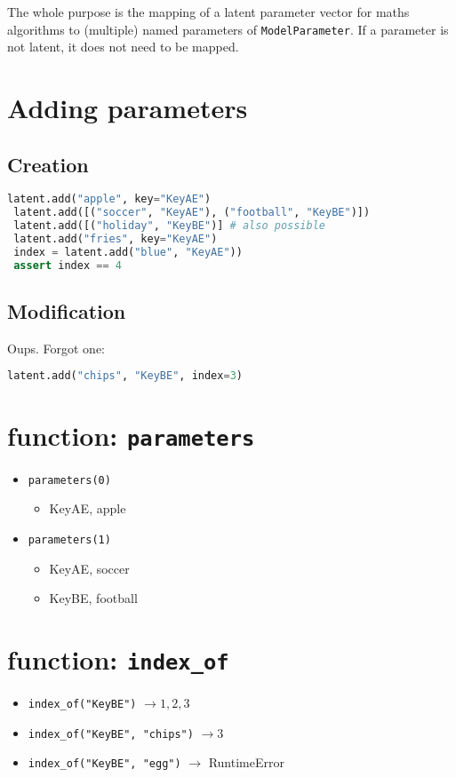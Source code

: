 \documentclass{article}
\begin{document}
The whole purpose is the mapping of a latent parameter vector for maths algorithms
to (multiple) named parameters of \texttt{ModelParameter}. If a parameter is not 
latent, it does not need to be mapped.

\section{Adding parameters}

\subsection{Creation}
\begin{lstlisting}[basicstyle=\ttfamily, language=python]
 latent.add("apple", key="KeyAE") 
 latent.add([("soccer", "KeyAE"), ("football", "KeyBE")])
 latent.add([("holiday", "KeyBE")] # also possible
 latent.add("fries", key="KeyAE")
 index = latent.add("blue", "KeyAE"))
 assert index == 4
\end{lstlisting}

\subsection{Modification}

Oups. Forgot one:

\begin{lstlisting}[basicstyle=\ttfamily, language=python]
 latent.add("chips", "KeyBE", index=3)
\end{lstlisting}

\section{function: \texttt{parameters}}

\begin{itemize}
  \item \texttt{parameters(0)}
  \begin{itemize}
    \item KeyAE, apple
  \end{itemize}
  \item \texttt{parameters(1)}
  \begin{itemize}
    \item KeyAE, soccer
    \item KeyBE, football
  \end{itemize}
\end{itemize}

\section{function: \texttt{index\_of}}

\begin{itemize}
  \item \texttt{index\_of("KeyBE")} $\to 1,2,3$
  \item \texttt{index\_of("KeyBE", "chips")} $\to 3$
  \item \texttt{index\_of("KeyBE", "egg")} $\to$ RuntimeError
\end{itemize}
\end{document}
